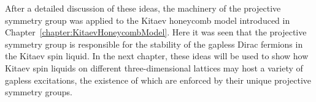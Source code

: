After a detailed discussion of these ideas, the machinery of the projective symmetry group was applied to the Kitaev honeycomb model introduced in Chapter~\ref{chapter:KitaevHoneycombModel}.
Here it was seen that the projective symmetry group is responsible for the stability of the gapless Dirac fermions in the Kitaev spin liquid.
In the next chapter, these ideas will be used to show how Kitaev spin liquids on different three-dimensional lattices may host a variety of gapless excitations, the existence of which are enforced by their unique projective symmetry groups.